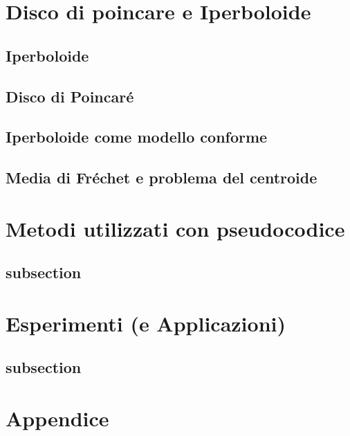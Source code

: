 \documentclass[a4paper, 12pt]{article}
\begin{document}
\section{Disco di poincare e Iperboloide}

\subsection{Iperboloide}

\subsection{Disco di Poincaré}

\subsection{Iperboloide come modello conforme}

\subsection{Media di Fréchet e problema del centroide}

\section{Metodi utilizzati con pseudocodice}

\subsection{subsection}

\section{Esperimenti (e Applicazioni)}

\subsection{subsection}

\section{Appendice}
\end{document}
